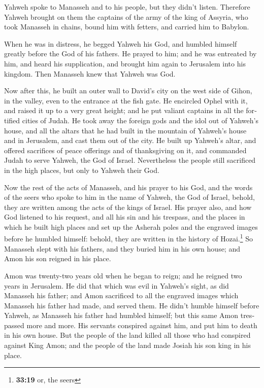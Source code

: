 \begin{paracol}{2}
\begin{otherlanguage}{english}
 Yahweh spoke to Manasseh and to his people, but they
didn't listen.  Therefore Yahweh brought on them the
captains of the army of the king of Assyria, who took Manasseh in
chains, bound him with fetters, and carried him to Babylon.

 When he was in distress, he begged Yahweh his God, and
humbled himself greatly before the God of his fathers. 
He prayed to him; and he was entreated by him, and heard his
supplication, and brought him again to Jerusalem into his kingdom. Then
Manasseh knew that Yahweh was God.

 Now after this, he built an outer wall to David's city
on the west side of Gihon, in the valley, even to the entrance at the
fish gate. He encircled Ophel with it, and raised it up to a very great
height; and he put valiant captains in all the fortified cities of
Judah.  He took away the foreign gods and the idol out of
Yahweh's house, and all the altars that he had built in the mountain of
Yahweh's house and in Jerusalem, and cast them out of the city.
 He built up Yahweh's altar, and offered sacrifices of
peace offerings and of thanksgiving on it, and commanded Judah to serve
Yahweh, the God of Israel.  Nevertheless the people still
sacrificed in the high places, but only to Yahweh their God.

 Now the rest of the acts of Manasseh, and his prayer to
his God, and the words of the seers who spoke to him in the name of
Yahweh, the God of Israel, behold, they are written among the acts of
the kings of Israel.  His prayer also, and how God
listened to his request, and all his sin and his trespass, and the
places in which he built high places and set up the Asherah poles and
the engraved images before he humbled himself: behold, they are written
in the history of Hozai.\footnote{\textbf{33:19} or, the seers}
 So Manasseh slept with his fathers, and they buried him
in his own house; and Amon his son reigned in his place.

 Amon was twenty-two years old when he began to reign;
and he reigned two years in Jerusalem.  He did that which
was evil in Yahweh's sight, as did Manasseh his father; and Amon
sacrificed to all the engraved images which Manasseh his father had
made, and served them.  He didn't humble himself before
Yahweh, as Manasseh his father had humbled himself; but this same Amon
trespassed more and more.  His servants conspired against
him, and put him to death in his own house.  But the
people of the land killed all those who had conspired against King Amon;
and the people of the land made Josiah his son king in his place.


\end{otherlanguage}
\end{paracol}
